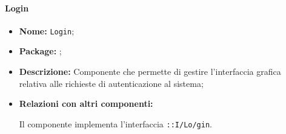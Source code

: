 \paragraph{Login}
\begin{flushleft}
\begin{itemize}
\item \textbf{Nome:} \texttt{Login};
\item \textbf{Package:} \texttt{\view{}};
\item \textbf{Descrizione:} Componente che permette di gestire l'interfaccia grafica relativa alle richieste di autenticazione al sistema;
\item \textbf{Relazioni con altri componenti:}
\begin{sloppypar}
Il componente implementa l'interfaccia \texttt{\view{}::I\fshyp{}Lo\fshyp{}gin}.
\end{sloppypar}
\end{itemize}
\end{flushleft}



